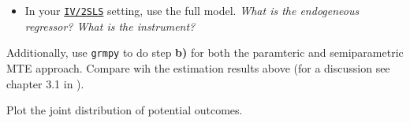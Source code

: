 \begin{boenumerate}
\begin{itemize}
  	\item In your \href{https://bashtage.github.io/linearmodels/doc/iv/introduction.html}{\texttt{IV/2SLS}} setting, use the full model. \emph{What is the endogeneous regressor? What is the instrument?}
  \end{itemize} 
  
  Additionally, use \texttt{grmpy} to do step \textbf{b)} for both the paramteric and semiparametric MTE approach. Compare wih the estimation results above (for a discussion see chapter 3.1 in \cite{Heckman.2007f}).
  
  \item Plot the joint distribution of potential outcomes.
  

\end{boenumerate}

\nocite{grmpy-1.0}





